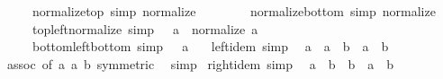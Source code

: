 \begin{isabellebody}
\ \ \ \ \ normalize{\isacharunderscore}{\kern0pt}top\ {\isacharbrackleft}{\kern0pt}simp{\isacharbrackright}{\kern0pt}{\isacharcolon}{\kern0pt}\ {\isachardoublequoteopen}normalize\ \isactrlbold {\isasymtop}\ {\isacharequal}{\kern0pt}\ \isactrlbold {\isasymtop}{\isachardoublequoteclose}\isanewline
\ \ \ \ \ normalize{\isacharunderscore}{\kern0pt}bottom\ {\isacharbrackleft}{\kern0pt}simp{\isacharbrackright}{\kern0pt}{\isacharcolon}{\kern0pt}\ {\isachardoublequoteopen}normalize\ \isactrlbold {\isasymbottom}\ {\isacharequal}{\kern0pt}\ \isactrlbold {\isasymbottom}{\isachardoublequoteclose}\isanewline
\ \ \ \ \ top{\isacharunderscore}{\kern0pt}left{\isacharunderscore}{\kern0pt}normalize\ {\isacharbrackleft}{\kern0pt}simp{\isacharbrackright}{\kern0pt}{\isacharcolon}{\kern0pt}\ {\isachardoublequoteopen}\isactrlbold {\isasymtop}\ \isactrlbold {\isacharasterisk}{\kern0pt}\ a\ {\isacharequal}{\kern0pt}\ normalize\ a{\isachardoublequoteclose}\isanewline
\ \ \ \ \ bottom{\isacharunderscore}{\kern0pt}left{\isacharunderscore}{\kern0pt}bottom\ {\isacharbrackleft}{\kern0pt}simp{\isacharbrackright}{\kern0pt}{\isacharcolon}{\kern0pt}\ {\isachardoublequoteopen}\isactrlbold {\isasymbottom}\ \isactrlbold {\isacharasterisk}{\kern0pt}\ a\ {\isacharequal}{\kern0pt}\ \isactrlbold {\isasymbottom}{\isachardoublequoteclose}\isanewline
{}\isanewline
\isanewline
{}\isamarkupfalse%
\ left{\isacharunderscore}{\kern0pt}idem\ {\isacharbrackleft}{\kern0pt}simp{\isacharbrackright}{\kern0pt}{\isacharcolon}{\kern0pt}\isanewline
\ \ {\isachardoublequoteopen}a\ \isactrlbold {\isacharasterisk}{\kern0pt}\ {\isacharparenleft}{\kern0pt}a\ \isactrlbold {\isacharasterisk}{\kern0pt}\ b{\isacharparenright}{\kern0pt}\ {\isacharequal}{\kern0pt}\ a\ \isactrlbold {\isacharasterisk}{\kern0pt}\ b{\isachardoublequoteclose}\isanewline
%
\isadelimproof
\ \ %
\endisadelimproof
%
\isatagproof
{}\isamarkupfalse%
\ assoc\ {\isacharbrackleft}{\kern0pt}of\ a\ a\ b{\isacharcomma}{\kern0pt}\ symmetric{\isacharbrackright}{\kern0pt}\ \isamarkupfalse%
\ simp%
\endisatagproof
{\isafoldproof}%
%
\isadelimproof
\isanewline
%
\endisadelimproof
\isanewline
{}\isamarkupfalse%
\ right{\isacharunderscore}{\kern0pt}idem\ {\isacharbrackleft}{\kern0pt}simp{\isacharbrackright}{\kern0pt}{\isacharcolon}{\kern0pt}\isanewline
\ \ {\isachardoublequoteopen}{\isacharparenleft}{\kern0pt}a\ \isactrlbold {\isacharasterisk}{\kern0pt}\ b{\isacharparenright}{\kern0pt}\ \isactrlbold {\isacharasterisk}{\kern0pt}\ b\ {\isacharequal}{\kern0pt}\ a\ \isactrlbold {\isacharasterisk}{\kern0pt}\ b{\isachardoublequoteclose}\isanewline

\end{isabellebody}
